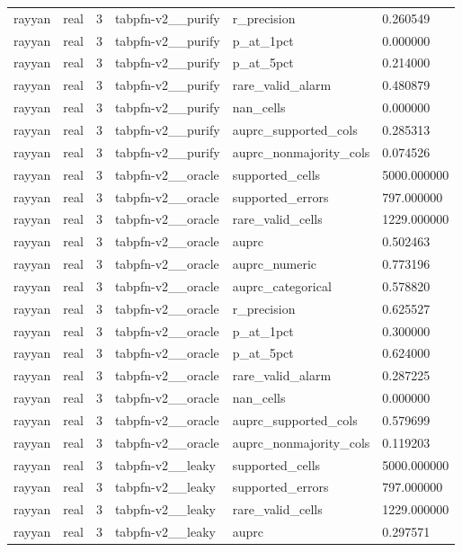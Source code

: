 \begin{tabular}{llllll}
rayyan & real & 3 & tabpfn-v2\_\_purify & r\_precision & 0.260549 \\
rayyan & real & 3 & tabpfn-v2\_\_purify & p\_at\_1pct & 0.000000 \\
rayyan & real & 3 & tabpfn-v2\_\_purify & p\_at\_5pct & 0.214000 \\
rayyan & real & 3 & tabpfn-v2\_\_purify & rare\_valid\_alarm & 0.480879 \\
rayyan & real & 3 & tabpfn-v2\_\_purify & nan\_cells & 0.000000 \\
rayyan & real & 3 & tabpfn-v2\_\_purify & auprc\_supported\_cols & 0.285313 \\
rayyan & real & 3 & tabpfn-v2\_\_purify & auprc\_nonmajority\_cols & 0.074526 \\
rayyan & real & 3 & tabpfn-v2\_\_oracle & supported\_cells & 5000.000000 \\
rayyan & real & 3 & tabpfn-v2\_\_oracle & supported\_errors & 797.000000 \\
rayyan & real & 3 & tabpfn-v2\_\_oracle & rare\_valid\_cells & 1229.000000 \\
rayyan & real & 3 & tabpfn-v2\_\_oracle & auprc & 0.502463 \\
rayyan & real & 3 & tabpfn-v2\_\_oracle & auprc\_numeric & 0.773196 \\
rayyan & real & 3 & tabpfn-v2\_\_oracle & auprc\_categorical & 0.578820 \\
rayyan & real & 3 & tabpfn-v2\_\_oracle & r\_precision & 0.625527 \\
rayyan & real & 3 & tabpfn-v2\_\_oracle & p\_at\_1pct & 0.300000 \\
rayyan & real & 3 & tabpfn-v2\_\_oracle & p\_at\_5pct & 0.624000 \\
rayyan & real & 3 & tabpfn-v2\_\_oracle & rare\_valid\_alarm & 0.287225 \\
rayyan & real & 3 & tabpfn-v2\_\_oracle & nan\_cells & 0.000000 \\
rayyan & real & 3 & tabpfn-v2\_\_oracle & auprc\_supported\_cols & 0.579699 \\
rayyan & real & 3 & tabpfn-v2\_\_oracle & auprc\_nonmajority\_cols & 0.119203 \\
rayyan & real & 3 & tabpfn-v2\_\_leaky & supported\_cells & 5000.000000 \\
rayyan & real & 3 & tabpfn-v2\_\_leaky & supported\_errors & 797.000000 \\
rayyan & real & 3 & tabpfn-v2\_\_leaky & rare\_valid\_cells & 1229.000000 \\
rayyan & real & 3 & tabpfn-v2\_\_leaky & auprc & 0.297571 \\

\end{tabular}

